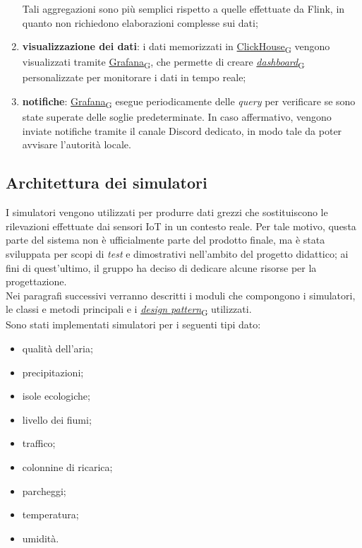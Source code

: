 \begin{enumerate}
	      Tali aggregazioni sono più semplici rispetto a quelle effettuate da Flink, in quanto non richiedono elaborazioni complesse sui dati;
	\item \textbf{visualizzazione dei dati}: i dati memorizzati in \href{https://7last.github.io/docs/pb/documentazione-interna/glossario\#clickhouse}{ClickHouse\textsubscript{G}} vengono visualizzati tramite \href{https://7last.github.io/docs/pb/documentazione-interna/glossario\#grafana}{Grafana\textsubscript{G}}, che permette di creare \href{https://7last.github.io/docs/pb/documentazione-interna/glossario\#dashboard}{\textit{dashboard}\textsubscript{G}} personalizzate per monitorare i dati in tempo reale;
	\item \textbf{notifiche}: \href{https://7last.github.io/docs/pb/documentazione-interna/glossario\#grafana}{Grafana\textsubscript{G}} esegue periodicamente delle \textit{query} per verificare se sono state superate delle soglie predeterminate. In caso affermativo, vengono inviate notifiche tramite il canale Discord dedicato, in modo tale da poter avvisare l'autorità locale.
\end{enumerate}

\subsection{Architettura dei simulatori}
I simulatori vengono utilizzati per produrre dati grezzi che sostituiscono le rilevazioni effettuate dai sensori IoT in un contesto reale.
Per tale motivo, questa parte del sistema non è ufficialmente parte del prodotto finale, ma è stata sviluppata per scopi di \textit{test}
e dimostrativi nell'ambito del progetto didattico; ai fini di quest'ultimo, il gruppo ha deciso di dedicare alcune risorse per la progettazione.\\
Nei paragrafi successivi verranno descritti i moduli che compongono i simulatori, le classi e metodi principali e i \href{https://7last.github.io/docs/pb/documentazione-interna/glossario\#design-pattern}{\textit{design pattern}\textsubscript{G}} utilizzati.\\
Sono stati implementati simulatori per i seguenti tipi dato:
\begin{itemize}
	\item qualità dell'aria;
	\item precipitazioni;
	\item isole ecologiche;
	\item livello dei fiumi;
	\item traffico;
	\item colonnine di ricarica;
	\item parcheggi;
	\item temperatura;
	\item umidità.
\end{itemize}

